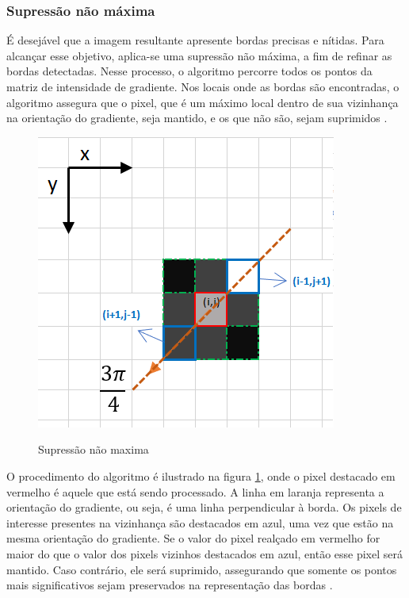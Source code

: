 \subsubsection[Supressão não máxima]{Supressão não máxima}

É desejável que a imagem resultante apresente bordas precisas e nítidas. Para alcançar esse objetivo, aplica-se uma supressão não máxima, a fim de refinar as bordas detectadas. Nesse processo, o algoritmo percorre todos os pontos da matriz de intensidade de gradiente. Nos locais onde as bordas são encontradas, o algoritmo assegura que o pixel, que é um máximo local dentro de sua vizinhança na orientação do gradiente, seja mantido, e os que não são, sejam suprimidos \cite{canny-edge-detection-python}.

\begin{figure}[H]
	\centering
    \caption{Supressão não maxima}
	\includegraphics[scale=0.65]{figuras/filter/supressao_nao_maxima/supressao3.png}
	\label{fig:Supressao nao maxima}
\end{figure}

O procedimento do algoritmo é ilustrado na figura \ref{fig:Supressao nao maxima}, onde o pixel destacado em vermelho é aquele que está sendo processado. A linha em laranja representa a orientação do gradiente, ou seja, é uma linha perpendicular à borda. Os pixels de interesse presentes na vizinhança são destacados em azul, uma vez que estão na mesma orientação do gradiente. Se o valor do pixel realçado em vermelho for maior do que o valor dos pixels vizinhos destacados em azul, então esse pixel será mantido. Caso contrário, ele será suprimido, assegurando que somente os pontos mais significativos sejam preservados na representação das bordas \cite{canny-edge-detection-python}.


